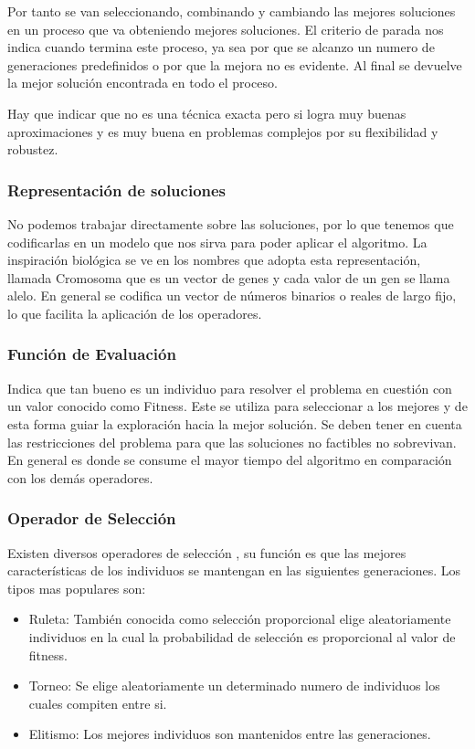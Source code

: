 Por tanto se van seleccionando, combinando y cambiando las mejores soluciones en un proceso que va obteniendo mejores soluciones.
El criterio de parada nos indica cuando termina este proceso, ya sea por que se alcanzo un numero de generaciones predefinidos o por que la mejora no es evidente. Al final se devuelve la mejor solución encontrada en todo el proceso.

Hay que indicar que no es una técnica exacta pero si logra muy buenas aproximaciones y es muy buena en problemas complejos por su flexibilidad y robustez. 


\subsubsection{Representación de soluciones}
No podemos trabajar directamente sobre las soluciones, por lo que tenemos que codificarlas en un modelo que nos sirva para poder aplicar el algoritmo.
La inspiración biológica se ve en los nombres que adopta esta representación, llamada Cromosoma que es un vector de genes y cada valor de un gen se llama alelo.
En general se codifica un vector de números binarios o reales de largo fijo, lo que facilita la aplicación de los operadores.

\subsubsection{Función de Evaluación} 
Indica que tan bueno es un individuo para resolver el problema en cuestión con un valor conocido como Fitness. Este se utiliza para seleccionar a los mejores y de esta forma guiar la exploración hacia la mejor solución.
Se deben tener en cuenta las restricciones del problema para que las soluciones no factibles no sobrevivan.
En general es donde se consume el mayor tiempo del algoritmo en comparación con los demás operadores.

\subsubsection{Operador de Selección}
Existen diversos operadores de selección , su función es que las mejores características de los individuos se mantengan en las siguientes generaciones.
Los tipos mas populares son:

\begin{itemize}
	\item Ruleta: También conocida como selección proporcional elige aleatoriamente individuos en la cual la probabilidad de selección es proporcional al valor de fitness.
	\item Torneo: Se elige aleatoriamente un determinado numero de individuos los cuales compiten entre si.
	\item Elitismo: Los mejores individuos son mantenidos entre las generaciones.
\end{itemize}

